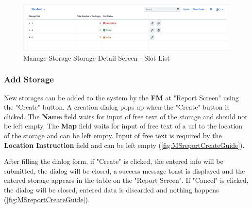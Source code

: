 \begin{figure}[H] %
	\centering
	\includegraphics[width=1\linewidth]{images/user_doc/storage/updatedSlotEditDelete/StorageObjectSlotTable.png}
	\caption{Manage Storage Storage Detail Screen - Slot List}
	\label{fig:MSstorageObjSlotList}
\end{figure}

\bigskip

\subsubsection{Add Storage}

New storages can be added to the system by the \textbf{FM} at "Report Screen" using the "Create" button.
A creation dialog pops up when the "Create" button is clicked. The \textbf{Name} field waits for input of free text of the storage and should not be left empty. The \textbf{Map} field waits for input of free text of a url to the location of the storage and can be left empty. Input of free text is required by the \textbf{Location Instruction} field and can be left empty (\autoref{fig:MSreportCreateGuide}).

After filling the dialog form, if "Create" is clicked, the entered info will be submitted, the dialog will be closed, a success message toast is displayed and the entered storage appears in the table on the "Report Screen". If "Cancel" is clicked, the dialog will be closed, entered data is discarded and nothing happens (\autoref{fig:MSreportCreateGuide}).


